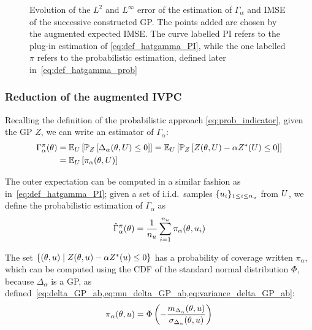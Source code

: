 \documentclass[../../Main_ManuscritThese.tex]{subfiles}
\newcommand\imgpath{/home/victor/acadwriting/Manuscrit/Text/Chapter4/img/}
\begin{document}
\begin{figure}[ht]
  \centering
  
  \caption[Augmented IMSE for the estimation of
  $\Gamma_{\alpha}$]{\label{fig:IMSE_enrichment} Evolution of the
    $L^2$ and $L^\infty$ error of the estimation of $\Gamma_\alpha$
    and IMSE of the successive constructed GP. The points added are
    chosen by the augmented expected IMSE. The curve labelled
    $\mathrm{PI}$ refers to the plug-in estimation of
    \cref{eq:def_hatgamma_PI}, while the one labelled $\pi$ refers to
    the probabilistic estimation, defined later in~\cref{eq:def_hatgamma_prob}}
\end{figure}


\subsubsection{Reduction of the augmented IVPC}

Recalling the definition of the probabilistic approach
\cref{eq:prob_indicator}, given the GP $Z$, we can write an estimator
of $\Gamma_{\alpha}$:
\begin{align}
  \label{eq:def_gamma_prob}
  \Gamma_{\alpha}^{\pi}(\theta) &= \mathbb{E}_U\left[ \mathbb{P}_{Z}\left[ \Delta_{\alpha}(\theta,U) \leq 0\right]\right] = \mathbb{E}_U\left[ \mathbb{P}_{Z}\left[ Z(\theta, U) - \alpha Z^*(U) \leq 0\right]\right] \\
                                   &= \mathbb{E}_U\left[\pi_{\alpha}(\theta,U)\right]
\end{align}

The outer expectation can be computed in a similar fashion as
in~\cref{eq:def_hatgamma_PI}; given a set of i.i.d.\ samples
$\{u_i\}_{1\leq i\leq n_{u}}$ from $U$, we define the
probabilistic estimation of $\Gamma_{\alpha}$ as
\begin{equation}
  \label{eq:def_hatgamma_prob}
  \hat{\Gamma}_{\alpha}^{\pi}(\theta) = \frac{1}{n_{u}}\sum_{i=1}^{n_{u}} \pi_{\alpha}(\theta, u_i)
\end{equation}


The set $\{(\theta, u) \mid Z(\theta, u) - \alpha Z^*(u)\leq 0\}$ has
a probability of coverage written $\pi_{\alpha}$, which can be
computed using the CDF of the standard normal distribution $\Phi$,
because $\Delta_{\alpha}$ is a GP, as
defined~\cref{eq:delta_GP_ab,eq:mu_delta_GP_ab,eq:variance_delta_GP_ab}:
\begin{equation}
  \label{eq:def_pialphaku}
  \pi_{\alpha}(\theta,u) = \Phi\left(-\frac{m_{\Delta_\alpha}(\theta,u)}{\sigma_{\Delta_\alpha}(\theta,u)}\right)
\end{equation}
\end{document}
